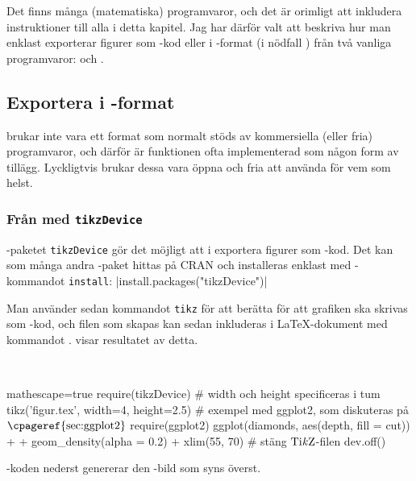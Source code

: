 \documentclass[10pt,../../a4.tex]{subfiles}
\begin{document}
Det finns många (matematiska) programvaror, och det är orimligt att
inkludera instruktioner till alla i detta kapitel. Jag har därför valt
att beskriva hur man enklast exporterar figurer som \PGFTikZ-kod eller
i \PDF-format (i nödfall \PNG) från två vanliga programvaror:
\Rlogo och \MATLAB.

\subsection{Exportera i \texorpdfstring{\PGFTikZ}{PGF/TikZ}-format}
\PGFTikZ brukar inte vara ett format som normalt stöds av kommersiella
(eller fria) programvaror, och därför är funktionen ofta implementerad
som någon form av tillägg. Lyckligtvis brukar dessa vara öppna och fria
att använda för vem som helst.

\subsubsection{Från \texorpdfstring{\Rlogo}{R} med \texttt{tikzDevice}}
\Rlogo-paketet \texttt{tikzDevice} \parencite{Sharpsteen12} gör det möjligt
att i \Rlogo exportera figurer som \PGFTikZ-kod. Det kan som många andra
\Rlogo-paket hittas på CRAN och installeras enklast med \Rlogo-kommandot \texttt{install}:
\splus|install.packages("tikzDevice")|

Man använder
sedan kommandot \texttt{tikz} för att berätta för \Rlogo att grafiken
ska skrivas som \PGFTikZ-kod, och filen som skapas kan sedan inkluderas
i \LaTeX-dokument med kommandot .
 visar resultatet av detta.

\begin{kod}[tbp]
	\centering
	\begin{minipage}{\textwidth}
		\centering
		
	\end{minipage}
	\\[1ex]
	\begin{minipage}{\textwidth}
		\begin{rcode*}{mathescape=true}
require(tikzDevice)
# width och height specificeras i tum
tikz('figur.tex', width=4, height=2.5)
# exempel med ggplot2, som diskuteras på $\text{\cpageref{sec:ggplot2}}$
require(ggplot2)
ggplot(diamonds, aes(depth, fill = cut)) +
  + geom_density(alpha = 0.2) + xlim(55, 70)
# stäng $\text{Ti\textit{k}Z}$-filen
dev.off()
		\end{rcode*}
	\end{minipage}
	\caption{\Rlogo-koden nederst genererar den \PGFTikZ-bild som
	syns överst.}
	\label{ex:tikzdevice}
\end{kod}
\end{document}
